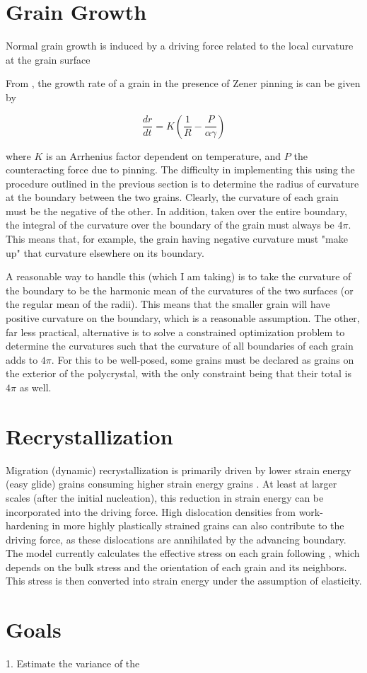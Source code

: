 \documentclass{article}
\begin{document}
\section{Grain Growth}
Normal grain growth is induced by a driving force related to the local curvature at the grain surface

From \citet{durand2006}, the growth rate of a grain in the presence of Zener pinning is can be given by

\[\frac{dr}{dt} = K \left( \frac{1}{R}-\frac{P}{\alpha \gamma} \right)
\]

where $K$ is an Arrhenius factor dependent on temperature, and $P$ the counteracting force due to pinning. The difficulty in implementing this using the procedure outlined in the previous section is to determine the radius of curvature at the boundary between the two grains. Clearly, the curvature of each grain must be the negative of the other. In addition, taken over the entire boundary, the integral of the curvature over the boundary of the grain must always be $4 \pi$. This means that, for example, the grain having negative curvature must "make up" that curvature elsewhere on its boundary. 

A reasonable way to handle this (which I am taking)  is to take the curvature of the boundary to be the harmonic mean of the curvatures of the two surfaces (or the regular mean of the radii). This means that the smaller grain will have positive curvature on the boundary, which is a reasonable assumption. The other, far less practical, alternative is to solve a constrained optimization problem to determine the curvatures such that the curvature of all boundaries of each grain adds to $4 \pi$. For this to be well-posed, some grains must be declared as grains on the exterior of the polycrystal, with the only constraint being that their total is $4 \pi$ as well. 




\section{Recrystallization}
Migration (dynamic) recrystallization is primarily driven by lower strain energy (easy glide) grains consuming higher strain energy grains \citep{duval1995}. At least at larger scales (after the initial nucleation), this reduction in strain energy can be incorporated into the driving force. High dislocation densities from work-hardening in more highly plastically strained grains can also contribute to the driving force, as these dislocations are annihilated by the advancing boundary. The model currently calculates the effective stress on each grain following \citet{azuma96}, which depends on the bulk stress and the orientation of each grain and its neighbors. This stress is then converted into strain energy under the assumption of elasticity.

\section{Goals}

1. Estimate the variance of the 


\end{document}

